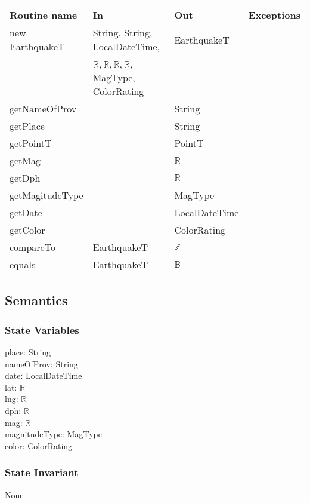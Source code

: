 \documentclass[12pt]{article}
\begin{document}
\begin{tabular}{| l | l | l | l |}
\hline
\textbf{Routine name} & \textbf{In} & \textbf{Out} & \textbf{Exceptions}\\
\hline
new EarthquakeT & String, String, LocalDateTime, & EarthquakeT &\\
\hhline{|~|~|~|}
~ &$\mathbb{R}, \mathbb{R}, \mathbb{R}, \mathbb{R}$, MagType, ColorRating & ~ &\\
\hline
getNameOfProv & ~ & String & \\
\hline
getPlace & ~ & String & \\
\hline
getPointT & ~ & PointT & \\
\hline
getMag & ~ & $\mathbb{R}$ & \\
\hline
getDph & ~ & $\mathbb{R}$ & \\
\hline
getMagitudeType & ~ & MagType & \\
\hline
getDate & ~ & LocalDateTime & \\
\hline
getColor & ~ & ColorRating & \\
\hline
compareTo & EarthquakeT & $\mathbb{Z}$ & \\
\hline
equals & EarthquakeT & $\mathbb{B}$ & \\
\hline
\end{tabular}

\subsection* {Semantics}

\subsubsection* {State Variables}

place: String\\ 
nameOfProv: String\\
date: LocalDateTime\\
lat: $\mathbb{R}$\\
lng: $\mathbb{R}$\\
dph: $\mathbb{R}$\\
mag: $\mathbb{R}$\\
magnitudeType: MagType\\
color: ColorRating

\subsubsection* {State Invariant}

None
\end{document}
